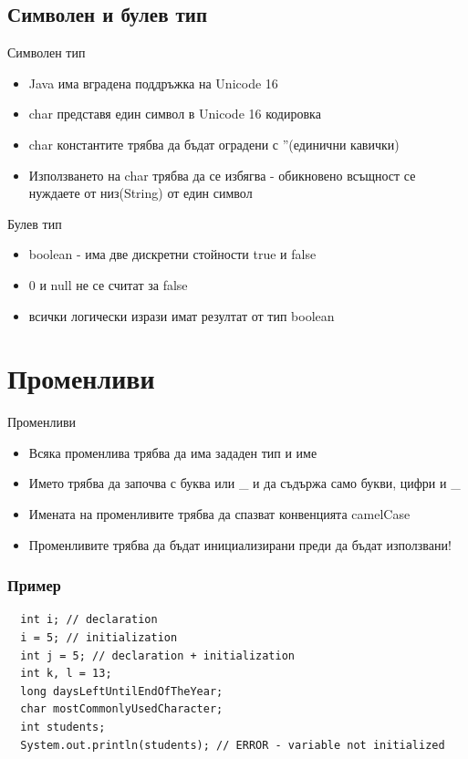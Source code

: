 \documentclass{beamer}
\begin{document}
\subsection{Символен и булев тип}
\begin{frame}{Символен тип}
  \transdissolve
  \begin{itemize}
  \item Java има вградена поддръжка на Unicode 16
  \item char представя един символ в Unicode 16 кодировка
  \item char константите трябва да бъдат оградени с ''(единични
    кавички)
  \item Използването на char трябва да се избягва - обикновено
    всъщност се нуждаете от низ(String) от един символ
  \end{itemize}
\end{frame}

\begin{frame}{Булев тип}
  \transdissolve
  \begin{itemize}
  \item boolean - има две дискретни стойности true и false
  \item 0 и null не се считат за false
  \item всички логически изрази имат резултат от тип boolean
  \end{itemize}
\end{frame}

\section{Променливи}
\begin{frame}{Променливи}
  \transdissolve
  \begin{itemize}
  \item Всяка променлива трябва да има
    зададен тип и име
  \item Името трябва да започва с буква или \_
    и да съдържа само букви, цифри и \_
  \item Имената на променливите трябва да спазват конвенцията camelCase
  \item Променливите трябва да бъдат инициализирани преди да бъдат използвани!
  \end{itemize}
\end{frame}

\begin{frame}[fragile]
  \frametitle{Пример}
  \transdissolve
\begin{lstlisting}
  int i; // declaration
  i = 5; // initialization
  int j = 5; // declaration + initialization
  int k, l = 13;
  long daysLeftUntilEndOfTheYear;
  char mostCommonlyUsedCharacter;
  int students;
  System.out.println(students); // ERROR - variable not initialized
\end{lstlisting}
\end{frame}
\end{document}
